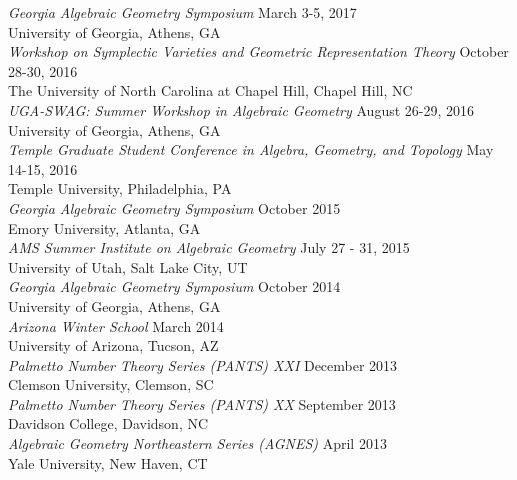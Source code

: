 \documentclass{article}
\begin{document}
\noindent\textsl{Georgia Algebraic Geometry Symposium} \hfill March 3-5, 2017\\
University of Georgia, Athens, GA\\

\noindent\textsl{Workshop on Symplectic Varieties and Geometric Representation Theory} \hfill October 28-30, 2016\\
The University of North Carolina at Chapel Hill, Chapel Hill, NC\\

\noindent\textsl{UGA-SWAG: Summer Workshop in Algebraic Geometry} \hfill August 26-29, 2016\\
University of Georgia, Athens, GA\\

\noindent\textsl{Temple Graduate Student Conference in Algebra, Geometry, and Topology} \hfill May 14-15, 2016\\
Temple University, Philadelphia, PA\\

\noindent\textsl{Georgia Algebraic Geometry Symposium} \hfill October 2015\\
Emory University, Atlanta, GA\\

\noindent\textsl{AMS Summer Institute on Algebraic Geometry} \hfill July 27 - 31, 2015\\
University of Utah, Salt Lake City, UT\\

\noindent\textsl{Georgia Algebraic Geometry Symposium} \hfill October 2014\\
University of Georgia, Athens, GA\\

\noindent\textsl{Arizona Winter School} \hfill March 2014\\
University of Arizona, Tucson, AZ\\

\noindent\textsl{Palmetto Number Theory Series (PANTS) XXI} \hfill December 2013\\
Clemson University, Clemson, SC\\

\noindent\textsl{Palmetto Number Theory Series (PANTS) XX} \hfill September 2013\\
Davidson College, Davidson, NC\\

\noindent\textsl{Algebraic Geometry Northeastern Series (AGNES)} \hfill April 2013\\
Yale University, New Haven, CT\\
\end{document}
